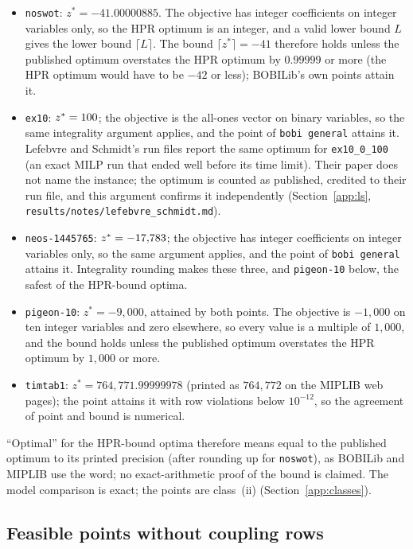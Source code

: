 \begin{itemize}
\item \texttt{noswot}: $z^{*}=-41.00000885$. The objective has integer
coefficients on integer variables only, so the HPR optimum is an integer, and
a valid lower bound $L$ gives the lower bound $\lceil L\rceil$. The bound
$\lceil z^{*}\rceil=-41$ therefore holds unless the published optimum
overstates the HPR optimum by $0.99999$ or more (the HPR optimum would have to
be $-42$ or less); BOBILib's own points attain it.
\item \texttt{ex10}: $z^{*}=100{}$; the objective is the all-ones vector on
binary variables, so the same integrality argument applies, and the point of
\texttt{bobi general} attains it. Lefebvre and Schmidt's run
files\cite{lefebvre2025dantzig} report the same optimum for \texttt{ex10\_0\_100}
(an exact MILP run that ended well before its time limit). Their paper does not name
the instance; the optimum is counted as published, credited to their run file, and
this argument confirms it independently (Section~\ref{app:ls},
\texttt{results/notes/lefebvre\_schmidt.md}).
\item \texttt{neos-1445765}: $z^{*}=-17{,}783{}$; the objective has integer
coefficients on integer variables only, so the same argument applies, and the point
of \texttt{bobi general} attains it.
Integrality rounding makes these three, and \texttt{pigeon-10} below, the
safest of the HPR-bound optima.
\item \texttt{pigeon-10}: $z^{*}=-9{,}000$, attained by both points. The
objective is $-1{,}000$ on ten integer variables and zero elsewhere, so every
value is a multiple of $1{,}000$, and the bound holds unless the published
optimum overstates the HPR optimum by $1{,}000$ or more.
\item \texttt{timtab1}: $z^{*}=764{,}771.99999978$ (printed as $764{,}772$ on
the MIPLIB web pages); the point attains it with row violations below
$10^{-12}$, so the agreement of point and bound is numerical.
\end{itemize}
``Optimal'' for the HPR-bound optima therefore means equal to the published optimum to
its printed precision (after rounding up for \texttt{noswot}), as BOBILib and
MIPLIB use the word; no exact-arithmetic proof of the bound is claimed. The
model comparison is exact; the points are class~(ii) (Section~\ref{app:classes}).

\subsection{Feasible points without coupling rows}

